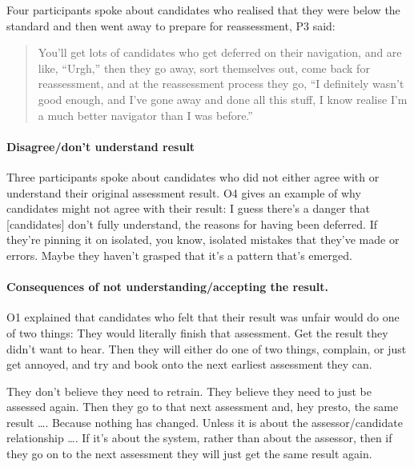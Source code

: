 \documentclass[a4paper,]{book}
\let\oldparagraph\paragraph
\renewcommand{\paragraph}[1]{\oldparagraph{#1}\mbox{}}
\begin{document}
Four participants spoke about candidates who realised that they were below the standard and then went away to prepare for reassessment, P3 said:

\begin{quote}
You'll get lots of candidates who get deferred on their navigation, and are like, ``Urgh,'' then they go away, sort themselves out, come back for reassessment, and at the reassessment process they go, ``I definitely wasn't good enough, and I've gone away and done all this stuff, I know realise I'm a much better navigator than I was before.''
\end{quote}

\hypertarget{disagreedont-understand-result}{%
\paragraph{Disagree/don't understand result}\label{disagreedont-understand-result}}

Three participants spoke about candidates who did not either agree with or understand their original assessment result. O4 gives an example of why candidates might not agree with their result:
I guess there's a danger that {[}candidates{]} don't fully understand, the reasons for having been deferred. If they're pinning it on isolated, you know, isolated mistakes that they've made or errors. Maybe they haven't grasped that it's a pattern that's emerged.

\hypertarget{consequences-of-not-understandingaccepting-the-result.}{%
\paragraph{Consequences of not understanding/accepting the result.}\label{consequences-of-not-understandingaccepting-the-result.}}

O1 explained that candidates who felt that their result was unfair would do one of two things:
They would literally finish that assessment. Get the result they didn't want to hear. Then they will either do one of two things, complain, or just get annoyed, and try and book onto the next earliest assessment they can.

They don't believe they need to retrain. They believe they need to just be assessed again. Then they go to that next assessment and, hey presto, the same result \ldots{}. Because nothing has changed. Unless it is about the assessor/candidate relationship \ldots{}. If it's about the system, rather than about the assessor, then if they go on to the next assessment they will just get the same result again.
\end{document}

